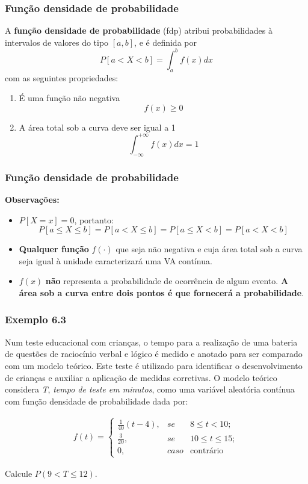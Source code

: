 \documentclass[11pt]{beamer}
\begin{document}
\begin{frame}
\frametitle{Função densidade de probabilidade}

A \textbf{função densidade de probabilidade} (fdp) atribui
probabilidades à intervalos de valores do tipo \([a,b]\), e é definida
por \[
P[a < X < b] = \int_{a}^{b} f(x) dx
\] com as seguintes propriedades:

\begin{enumerate}
\def\labelenumi{\roman{enumi}.}
\item
  É uma função não negativa \[f(x) \geq 0\]
\item
  A área total sob a curva deve ser igual a 1
  \[\int_{-\infty}^{+\infty} f(x) dx = 1\]
\end{enumerate}
\end{frame}


\begin{frame}
\frametitle{Função densidade de probabilidade}

\textbf{Observações:}

\begin{itemize}

\item
  \(P[X=x] = 0\), portanto: \[P[a \leq X \leq b] = P[a < X \leq b] = P[a
  \leq X < b] = P[a < X < b]\]
\item
  \textbf{Qualquer função} \(f(\cdot)\) que seja não negativa e cuja
  área total sob a curva seja igual à unidade caracterizará uma VA
  contínua.
\item
  \(f(x)\) \textbf{não} representa a probabilidade de ocorrência de
  algum evento. \textbf{A área sob a curva entre dois pontos é que
  fornecerá a probabilidade}.
\end{itemize}
\end{frame}

\begin{frame}
\frametitle{Exemplo 6.3}
Num teste educacional com crianças, o tempo para a realização de uma bateria de questões de raciocínio verbal e lógico é medido e anotado para ser comparado com um modelo teórico. Este teste é utilizado para identificar o desenvolvimento de crianças e auxiliar a aplicação de medidas corretivas. O modelo teórico considera \textit{T}, \textit{tempo de teste em minutos}, como uma variável aleatória contínua com função densidade de probabilidade dada por:


\begin{align*}
f(t) = \left\{\begin{matrix}
 \frac{1}{40}(t-4),& se & 8 \leq t < 10;\\ 
 \frac{3}{20},& se & 10 \leq t \leq 15; \\
 0,& caso & \text{contrário}
\end{matrix}\right.
\end{align*} 

Calcule \(P(9 < T \leq 12)\).

\end{frame}
\end{document}
